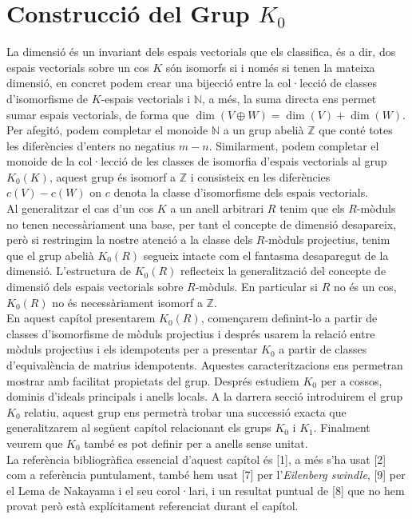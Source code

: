

\chapter{Construcció del Grup $K_0$} %

La dimensió és un invariant dels espais vectorials que els classifica, és a dir, dos espais vectorials sobre un cos $K$ són isomorfs si i només si tenen la mateixa dimensió, en concret podem crear una bijecció entre la col·lecció de classes d'isomorfisme de $K$-espais vectorials i $\mathbb{N}$, a més, la suma directa ens permet sumar espais vectorials, de forma que $\dim(V \oplus W) = \dim (V) + \dim (W)$. Per afegitó, podem completar el monoide $\mathbb{N}$  a un grup abelià $\mathbb{Z}$ que conté totes les diferències d'enters no negatius $m-n$. Similarment, podem completar el monoide de la col·lecció de les classes de isomorfia d'espais vectorials al grup $K_0(K)$, aquest grup és isomorf a $\mathbb{Z}$ i consisteix en les diferències $c(V)-c(W)$ on $c$ denota la classe d'isomorfisme dels espais vectorials. \\
\indent Al generalitzar el cas d'un cos $K$ a un anell arbitrari $R$ tenim que els $R$-mòduls no tenen necessàriament una base, per tant el concepte de dimensió desapareix, però si restringim la nostre atenció a la classe dels $R$-mòduls projectius, tenim que el grup abelià $K_0(R)$ segueix intacte com el fantasma desaparegut de la dimensió. L'estructura de $K_0(R)$ reflecteix la generalització del concepte de dimensió dels espais vectorials sobre $R$-mòduls. En particular si $R$ no és un cos, $K_0(R)$ no és necessàriament isomorf a $\mathbb{Z}$. \\ 
\indent En aquest capítol presentarem $K_0(R)$, començarem definint-lo a partir de classes d'isomorfisme de mòduls projectius i després usarem la relació entre mòduls projectius i els idempotents per a presentar $K_0$ a partir de classes d'equivalència de matrius idempotents. Aquestes caracteritzacions ens permetran mostrar amb facilitat propietats del grup. Després estudiem $K_0$ per a cossos, dominis d'ideals principals i anells locals. A la darrera secció introduirem el grup $K_0$ relatiu, aquest grup ens permetrà trobar una successió exacta que generalitzarem al següent capítol relacionant els grups $K_0$ i $K_1$. Finalment veurem que $K_0$ també es pot definir per a anells sense unitat.
\\
\indent La referència bibliogràfica essencial d'aquest capítol és [1], a més s'ha usat [2] com a referència puntulament, també hem usat [7]  per l'\textit{Eilenberg swindle}, [9] per el Lema de Nakayama i el seu corol·lari, i un resultat puntual de [8] que no hem provat però està explícitament referenciat durant el capítol.

